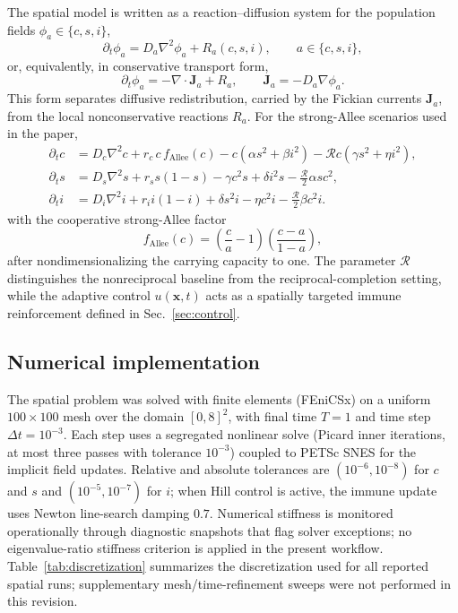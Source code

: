 The spatial model is written as a reaction--diffusion system for the population fields $\phi_a\in\{c,s,i\}$,
\begin{equation}
    \partial_t\phi_a
    =D_a\nabla^2\phi_a+R_a(c,s,i),
    \qquad a\in\{c,s,i\},
    \label{eq:rd-general}
\end{equation}
or, equivalently, in conservative transport form,
\begin{equation}
    \partial_t\phi_a=-\nabla\cdot\mathbf{J}_a+R_a,
    \qquad
    \mathbf{J}_a=-D_a\nabla\phi_a .
    \label{eq:transport-form}
\end{equation}
This form separates diffusive redistribution, carried by the Fickian currents $\mathbf{J}_a$, from the local nonconservative reactions $R_a$. For the strong-Allee scenarios used in the paper,
\begin{align}
\partial_t c &= D_c \nabla^2 c + r_c\, c\, f_{\text{Allee}}(c) - c(\alpha s^2 + \beta i^2) - \mathcal{R} c(\gamma s^2 + \eta i^2), \label{eq:pde-c}\\
\partial_t s &= D_s \nabla^2 s + r_s s(1-s) - \gamma c^2 s + \delta i^2 s - \tfrac{\mathcal{R}}{2}\alpha s c^2, \label{eq:pde-s}\\
\partial_t i &= D_i \nabla^2 i + r_i i(1-i) + \delta s^2 i - \eta c^2 i - \tfrac{\mathcal{R}}{2}\beta c^2 i . \label{eq:pde-i}
\end{align}
with the cooperative strong-Allee factor
\begin{equation}
    f_{\text{Allee}}(c)
    =\left(\frac{c}{a}-1\right)
     \left(\frac{c-a}{1-a}\right),
    \label{eq:strong-allee-factor}
\end{equation}
after nondimensionalizing the carrying capacity to one. The parameter $\mathcal{R}$ distinguishes the nonreciprocal baseline from the reciprocal-completion setting, while the adaptive control $u(\mathbf{x},t)$ acts as a spatially targeted immune reinforcement defined in Sec.~\ref{sec:control}.

\subsection{Numerical implementation}
The spatial problem was solved with finite elements (FEniCSx) on a uniform $100\times100$ mesh over the domain $[0,8]^2$, with final time $T=1$ and time step $\Delta t=10^{-3}$. Each step uses a segregated nonlinear solve (Picard inner iterations, at most three passes with tolerance $10^{-3}$) coupled to PETSc SNES for the implicit field updates. Relative and absolute tolerances are $(10^{-6},10^{-8})$ for $c$ and $s$ and $(10^{-5},10^{-7})$ for $i$; when Hill control is active, the immune update uses Newton line-search damping $0.7$. Numerical stiffness is monitored operationally through diagnostic snapshots that flag solver exceptions; no eigenvalue-ratio stiffness criterion is applied in the present workflow. Table~\ref{tab:discretization} summarizes the discretization used for all reported spatial runs; supplementary mesh/time-refinement sweeps were not performed in this revision.

